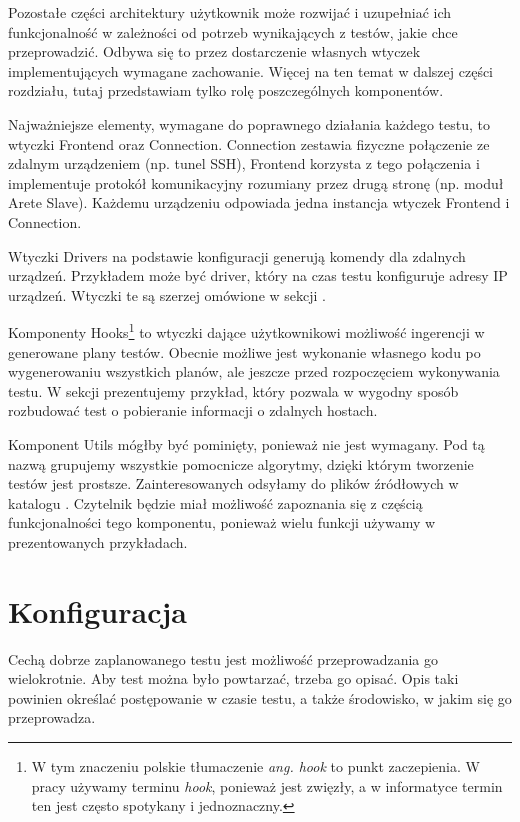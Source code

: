 \documentclass[00-praca-magisterska.tex]{subfiles}
\begin{document}
Pozostałe części architektury użytkownik może rozwijać i uzupełniać ich
funkcjonalność w zależności od potrzeb wynikających z testów, jakie chce
przeprowadzić. Odbywa się to przez dostarczenie własnych wtyczek
implementujących wymagane zachowanie. Więcej na ten temat w dalszej części
rozdziału, tutaj przedstawiam tylko rolę poszczególnych komponentów.

Najważniejsze elementy, wymagane do poprawnego działania każdego testu, to
wtyczki Frontend oraz Connection. Connection zestawia fizyczne połączenie ze
zdalnym urządzeniem (np. tunel SSH), Frontend korzysta z tego połączenia i
implementuje protokół komunikacyjny rozumiany przez drugą stronę (np. moduł
Arete Slave). Każdemu urządzeniu odpowiada jedna instancja wtyczek Frontend i
Connection.

Wtyczki Drivers na podstawie konfiguracji generują komendy dla zdalnych
urządzeń. Przykładem może być driver, który na czas testu konfiguruje adresy IP
urządzeń. Wtyczki te są szerzej omówione w sekcji .

Komponenty Hooks\footnote{W tym znaczeniu polskie tłumaczenie \emph{ang. hook}
to punkt zaczepienia. W pracy używamy terminu \emph{hook}, ponieważ jest zwięzły, a w
informatyce termin ten jest często spotykany i jednoznaczny.} to wtyczki dające
użytkownikowi możliwość ingerencji w generowane plany testów. Obecnie możliwe
jest wykonanie własnego kodu po wygenerowaniu wszystkich planów, ale jeszcze
przed rozpoczęciem wykonywania testu. W sekcji 
prezentujemy przykład, który pozwala w wygodny sposób rozbudować test o
pobieranie informacji o zdalnych hostach.

Komponent Utils mógłby być pominięty, ponieważ nie jest wymagany. Pod tą nazwą
grupujemy wszystkie pomocnicze algorytmy, dzięki którym tworzenie testów jest
prostsze. Zainteresowanych odsyłamy do plików źródłowych w katalogu
. Czytelnik będzie miał możliwość zapoznania się z częścią
funkcjonalności tego komponentu, ponieważ wielu funkcji używamy w
prezentowanych przykładach.

\label{arete-master-config}
\section{Konfiguracja}

Cechą dobrze zaplanowanego testu jest możliwość przeprowadzania go
wielokrotnie. Aby test można było powtarzać, trzeba go opisać. Opis taki
powinien określać postępowanie w czasie testu, a także środowisko, w jakim się
go przeprowadza.
\end{document}
